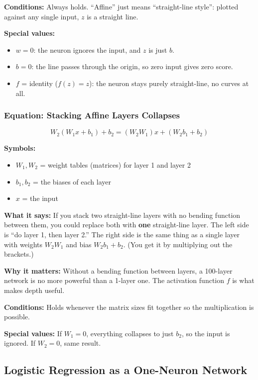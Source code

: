 \textbf{Conditions:} Always holds. ``Affine'' just means ``straight-line style'': plotted against any single input, $z$ is a straight line.

\textbf{Special values:}
\begin{itemize}
  \item $w = 0$: the neuron ignores the input, and $z$ is just $b$.
  \item $b = 0$: the line passes through the origin, so zero input gives zero score.
  \item $f$ = identity ($f(z) = z$): the neuron stays purely straight-line, no curves at all.
\end{itemize}

\subsubsection*{Equation: Stacking Affine Layers Collapses}

\[
W_2(W_1 x + b_1) + b_2 = (W_2 W_1)x + (W_2 b_1 + b_2)
\]

\textbf{Symbols:}
\begin{itemize}
  \item $W_1, W_2$ = weight tables (matrices) for layer 1 and layer 2
  \item $b_1, b_2$ = the biases of each layer
  \item $x$ = the input
\end{itemize}

\textbf{What it says:} If you stack two straight-line layers with no bending function between them, you could replace both with \textbf{one} straight-line layer. The left side is ``do layer 1, then layer 2.'' The right side is the same thing as a single layer with weights $W_2 W_1$ and bias $W_2 b_1 + b_2$. (You get it by multiplying out the brackets.)

\textbf{Why it matters:} Without a bending function between layers, a 100-layer network is no more powerful than a 1-layer one. The activation function $f$ is what makes depth useful.

\textbf{Conditions:} Holds whenever the matrix sizes fit together so the multiplication is possible.

\textbf{Special values:} If $W_1 = 0$, everything collapses to just $b_2$, so the input is ignored. If $W_2 = 0$, same result.

\subsection*{Logistic Regression as a One-Neuron Network}

